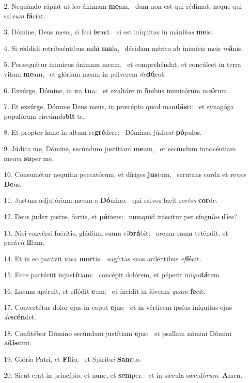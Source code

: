 2. Nequándo rápiat ut leo ánimam \textbf{me}am, \ast\  dum non est qui rédimat, neque qui sal\textit{vum} \textbf{fá}ciat.\

3. Dómine, Deus meus, si feci \textbf{is}tud. \ast\  si est iníquitas in máni\textit{bus} \textbf{me}is:\

4. Si réddidi retribuéntibus mihi \textbf{ma}la, \ast\  décidam mérito ab inimícis meis \textit{in}\textbf{á}nis.\

5. Persequátur inimícus ánimam meam, \dag\  et comprehéndat, et concúlcet in terra vitam \textbf{me}am, \ast\  et glóriam meam in púlverem \textit{de}\textbf{dú}cat.\

6. Exsúrge, Dómine, in ira \textbf{tu}a: \ast\  et exaltáre in fínibus inimicórum \textit{me}\textbf{ó}rum.\

7. Et exsúrge, Dómine Deus meus, in præcépto quod man\textbf{dás}ti: \ast\  et synagóga populórum circúm\textit{da}\textbf{bit} te.\

8. Et propter hanc in altum re\textbf{gré}dere: \ast\  Dóminus júdi\textit{cat} \textbf{pó}pulos.\

9. Júdica me, Dómine, secúndum justítiam \textbf{me}am, \ast\  et secúndum innocéntiam me\textit{am} \textbf{su}per me.\

10. Consumétur nequítia peccatórum, et díriges \textbf{jus}tum, \ast\  scrutans corda et re\textit{nes} \textbf{De}us.\

11. Justum adjutórium meum a \textbf{Dó}mino, \ast\  qui salvos facit rec\textit{tos} \textbf{cor}de.\

12. Deus judex justus, fortis, et \textbf{pá}tiens: \ast\  numquid iráscitur per síngu\textit{los} \textbf{di}es?\

13. Nisi convérsi fuéritis, gládium suum vi\textbf{brá}bit: \ast\  arcum suum teténdit, et pará\textit{vit} \textbf{il}lum.\

14. Et in eo parávit vasa \textbf{mor}tis: \ast\  sagíttas suas ardéntibus \textit{ef}\textbf{fé}cit.\

15. Ecce partúriit injus\textbf{tí}tiam: \ast\  concépit dolórem, et péperit ini\textit{qui}\textbf{tá}tem.\

16. Lacum apéruit, et effódit \textbf{e}um: \ast\  et íncidit in fóveam \textit{quam} \textbf{fe}cit.\

17. Convertétur dolor ejus in caput \textbf{e}jus: \ast\  et in vérticem ipsíus iníquitas ejus \textit{de}\textbf{scén}det.\

18. Confitébor Dómino secúndum justítiam \textbf{e}jus: \ast\  et psallam nómini Dómini \textit{al}\textbf{tís}simi.\

19. Glória Patri, et \textbf{Fí}lio, \ast\  et Spirítu\textit{i} \textbf{Sanc}to.\

20. Sicut erat in princípio, et nunc, et \textbf{sem}per, \ast\  et in sǽcula sæculó\textit{rum}. \textbf{A}men.\

